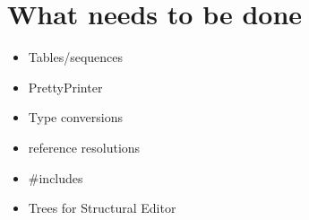 \documentclass{article}
\begin{document}
\section{What needs to be done}
\begin{itemize}
  \item Tables/sequences

  \item PrettyPrinter

  \item Type conversions

  \item reference resolutions

  \item \#includes

  \item Trees for Structural Editor

\end{itemize}
\end{document}
